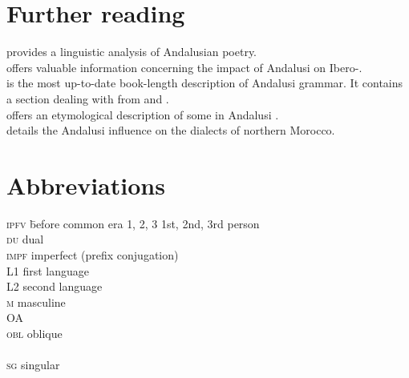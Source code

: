 \documentclass[output=paper,modfonts,nonflat]{langsci/langscibook}
\begin{document}
\section*{Further reading}

\citet{Corriente1997poetry} provides a linguistic analysis of Andalusian  poetry.\\
\citet{Corriente2005} offers valuable information concerning the impact of Andalusi  on Ibero-.\\
\citet{CorrientePereiraVicente2015} is the most up-to-date book-length description of Andalusi  grammar. It contains a section dealing with  from  and .\\ 
\citet{Ferrando1997} offers an etymological description of some   in Andalusi .\\ 
\citet{Vicente2010} details the Andalusi influence on the dialects of northern Morocco. 


\section*{Abbreviations}
\begin{multicols}{2}
\begin{tabbing}
\textsc{ipfv} \hspace{1em} \= before common era\kill
\textsc{1, 2, 3} \> 1st, 2nd, 3rd person \\
\textsc{du} \> dual \\
\textsc{impf} \> imperfect (prefix conjugation) \\
L1 \> first language \\
L2 \> second language \\
\textsc{m} \> masculine \\
OA \>   \\
\textsc{obl} \> oblique \\
 \>  \\
\textsc{sg} \> singular \\
 \> 
\end{tabbing}
\end{multicols}



\sloppy\printbibliography[heading=subbibliography,notkeyword=this]
\end{document}
